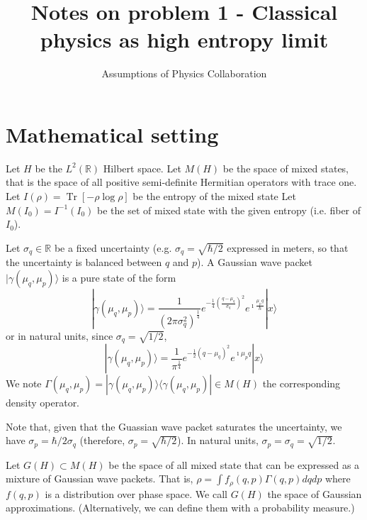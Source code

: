\documentclass[11pt]{article}
\def\>{\rangle}
\def\<{\langle}
\DeclareMathOperator{\Tr}{Tr}
\begin{document}
	\title{Notes on problem 1 - Classical physics as high entropy limit}
	\author{Assumptions of Physics Collaboration}

	\date{}

	\maketitle

\section{Mathematical setting}

Let $H$ be the $L^2(\mathbb{R})$ Hilbert space. Let $M(H)$ be the space of mixed states, that is the space of all positive semi-definite Hermitian operators with trace one. Let $I(\rho) = \Tr [-\rho \log \rho]$ be the entropy of the mixed state Let $M(I_0) = I^{-1}(I_0)$ be the set of mixed state with the given entropy (i.e. fiber of $I_0$).

Let $\sigma_q \in \mathbb{R}$ be a fixed uncertainty (e.g. $\sigma_q = \sqrt{\hbar/2}$ expressed in meters, so that the uncertainty is balanced between $q$ and $p$). A Gaussian wave packet $|\gamma(\mu_q,\mu_p)\>$ is a pure state of the form
\begin{equation}
	|\gamma(\mu_q,\mu_p)\> = \frac{1}{(2 \pi \sigma_q^2)^{\frac{1}{4}}} e^{-\frac{1}{4} \left(\frac{q-\mu_q}{\sigma_q}\right)^2} e^{\imath \frac{\mu_p q}{\hbar}} | x \>
\end{equation}
or in natural units, since $\sigma_q = \sqrt{1/2}$,
\begin{equation}
	|\gamma(\mu_q,\mu_p)\> = \frac{1}{\pi^{\frac{1}{4}}} e^{-\frac{1}{2} \left(q-\mu_q\right)^2} e^{\imath \mu_p q} | x \>
\end{equation}
We note $\Gamma(\mu_q,\mu_p) = |\gamma(\mu_q,\mu_p)\> \<\gamma(\mu_q,\mu_p)| \in M(H)$ the corresponding density operator.

Note that, given that the Guassian wave packet saturates the uncertainty, we have $\sigma_p = \hbar / 2 \sigma_q$ (therefore, $\sigma_p = \sqrt{\hbar/2}$). In natural units, $\sigma_p = \sigma_q = \sqrt{1/2}$.

Let $G(H) \subset M(H)$ be the space of all mixed state that can be expressed as a mixture of Gaussian wave packets. That is, $\rho = \int f_\rho(q, p) \Gamma(q, p) dq dp$ where $f(q, p)$ is a distribution over phase space. We call $G(H)$ the space of Gaussian approximations. (Alternatively, we can define them with a probability measure.)
\end{document}
